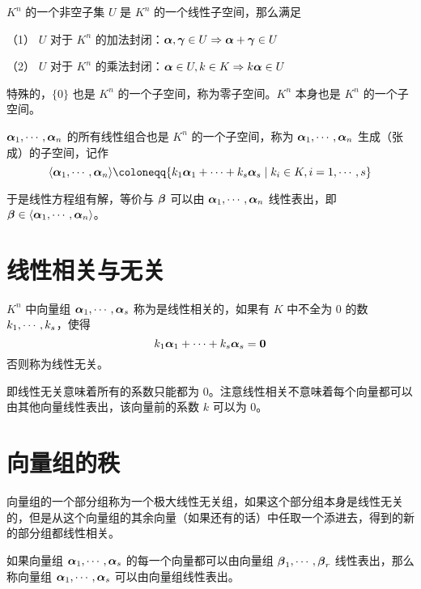 \begin{definition}[线性子空间]
	$K^n$ 的一个非空子集 $U$ 是 $K^n$ 的一个线性子空间，那么满足

	（1） $U$ 对于 $K^n$ 的加法封闭：$\boldsymbol{\alpha},\boldsymbol{\gamma}\in U \Rightarrow \boldsymbol{\alpha}+\boldsymbol{\gamma} \in U$

	（2） $U$ 对于 $K^n$ 的乘法封闭：$\boldsymbol{\alpha} \in U,k\in K \Rightarrow k\boldsymbol{\alpha} \in U$
\end{definition}

特殊的，$\{0\}$ 也是 $K^n$ 的一个子空间，称为零子空间。$K^n$ 本身也是 $K^n$ 的一个子空间。

$\boldsymbol{\alpha}_1,\cdots,\boldsymbol{\alpha}_n$ 的所有线性组合也是 $K^n$ 的一个子空间，称为 $\boldsymbol{\alpha}_1,\cdots,\boldsymbol{\alpha}_n$ 生成（张成）的子空间，记作
\[\langle \seq{\vbf{\alpha}}{n}\rangle\coloneqq \{k_1\vbf{\alpha}_1+\cdots+k_s\vbf{\alpha}_s \mid k_i\in K,i=1,\cdots,s\}\]

于是线性方程组有解，等价与 $\boldsymbol{\beta}$ 可以由 $\boldsymbol{\alpha}_1,\cdots,\boldsymbol{\alpha}_n$ 线性表出，即 $\boldsymbol{\beta} \in \langle\boldsymbol{\alpha}_1,\cdots,\boldsymbol{\alpha}_n\rangle$。

\section{线性相关与无关}

\begin{definition}
	$K^n$ 中向量组 $\boldsymbol{\alpha}_1,\cdots,\boldsymbol{\alpha}_s$ 称为是线性相关的，如果有 $K$ 中不全为 $0$ 的数 $k_1,\cdots,k_s$，使得
	\[k_1\boldsymbol{\alpha}_1+\cdots+k_s\boldsymbol{\alpha}_s=\boldsymbol{0}\]
	否则称为线性无关。
\end{definition}

即线性无关意味着所有的系数只能都为 $0$。注意线性相关不意味着每个向量都可以由其他向量线性表出，该向量前的系数 $k$ 可以为 $0$。

\section{向量组的秩}

\begin{definition}[极大线性无关组]
	向量组的一个部分组称为一个极大线性无关组，如果这个部分组本身是线性无关的，但是从这个向量组的其余向量（如果还有的话）中任取一个添进去，得到的新的部分组都线性相关。
\end{definition}

如果向量组 $\boldsymbol{\alpha}_1,\cdots,\boldsymbol{\alpha}_s$ 的每一个向量都可以由向量组 $\boldsymbol{\beta}_1,\cdots,\boldsymbol{\beta}_r$ 线性表出，那么称向量组 $\boldsymbol{\alpha}_1,\cdots,\boldsymbol{\alpha}_s$ 可以由向量组线性表出。

